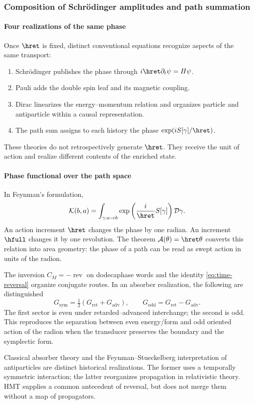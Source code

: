 \subsubsection{Composition of Schrödinger amplitudes and path summation}

\paragraph{Four realizations of the same phase}

Once \(\hret\) is fixed, distinct conventional equations recognize
aspects of the same transport:
\begin{enumerate}
\item Schrödinger publishes the phase through
\(i\hret\partial_t\psi=H\psi\).
\item Pauli adds the double spin leaf and its magnetic coupling.
\item Dirac linearizes the energy--momentum relation and organizes particle and antiparticle within a causal representation.
\item The path sum assigns to each history the phase
\(\exp(iS[\gamma]/\hret)\).
\end{enumerate}
These theories do not retrospectively generate \(\hret\). They receive the unit of
action and realize different contents of the enriched state.

\paragraph{Phase functional over the path space}

In Feynman's formulation,
\begin{equation}
\mathcal K(b,a)=\int_{\gamma:a\to b}
\exp\left(\frac{i}{\hret}S[\gamma]\right)\mathcal D\gamma.
\label{eq:path-integral}
\end{equation}
An action increment \(\hret\) changes the phase by one radian. An increment
\(\hfull\) changes it by one revolution. The theorem
\(\mathcal A(\theta)=\hret\theta\) converts this relation into area geometry:
the phase of a path can be read as swept action in units of the
radion.

The inversion \(C_M=-\operatorname{rev}\) on dodecaphase words and the identity \eqref{eq:time-reversal} organize conjugate routes. In an absorber realization, the following are distinguished
\[
G_{\mathrm{sym}}=\tfrac12(G_{\mathrm{ret}}+G_{\mathrm{adv}}),
\qquad
G_{\mathrm{odd}}=G_{\mathrm{ret}}-G_{\mathrm{adv}}.
\]
The first sector is even under retarded--advanced interchange; the second is
odd. This reproduces the separation between even energy/form and odd
oriented action of the radion when the transducer preserves the boundary and the
symplectic form.

\begin{statusbox}
Classical absorber theory and the Feynman--Stueckelberg interpretation of
antiparticles are distinct historical realizations. The former uses a
temporally symmetric interaction; the latter reorganizes propagation in
relativistic theory. HMT supplies a common antecedent of reversal, but does not
merge them without a map of propagators.
\end{statusbox}
